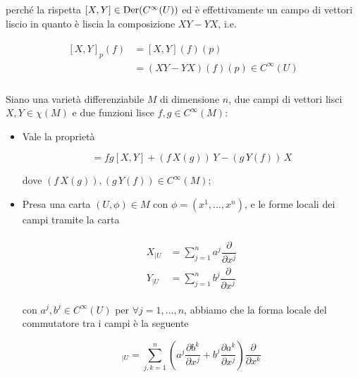 perché la rispetta $ [X,Y] \in \operatorname{Der}(C^{\infty}(U)) $ ed è effettivamente un campo di vettori liscio in quanto è liscia la composizione $ XY-YX $, i.e.

\begin{align}
	\begin{split}
		[X,Y]_{p}(f) &= [X,Y](f)(p)\\
		&= (XY-YX)(f)(p) \in C^{\infty}(U)\\
	\end{split}
\end{align}

\begin{definition}
	Siano una varietà differenziabile $ M $ di dimensione $ n $, due campi di vettori lisci $ X,Y \in \chi(M) $ e due funzioni lisce $ f,g \in C^{\infty}(M) $:
	
	\begin{itemize}
		\item Vale la proprietà
		
		\begin{equation}
			[f X, g Y] = f g [X,Y] + (f \, X(g)) \, Y - (g \, Y(f)) \, X
		\end{equation}
	
		dove $ (f \, X(g)), (g \, Y(f)) \in C^{\infty}(M) $;
	
		\item Presa una carta $ (U,\phi) \in M $ con $ \phi = (x^{1},\dots,x^{n}) $, e le forme locali dei campi tramite la carta
		
		\begin{align}
			\begin{split}
				X_{|U} &= \sum_{j=1}^{n} a^{j} \dfrac{\partial}{\partial x^{j}}\\
				Y_{|U} &= \sum_{j=1}^{n} b^{j} \dfrac{\partial}{\partial x^{j}}
			\end{split}
		\end{align}
	
		con $ a^{j},b^{j} \in C^{\infty}(U) $ per $ \forall j=1,\dots,n $, abbiamo che la forma locale del commutatore tra i campi è la seguente
		
		\begin{equation}
			[X,Y]_{|U} = \sum_{j,k=1}^{n} \left( a^{j} \dfrac{\partial b^{k}}{\partial x^{j}} + b^{j} \dfrac{\partial a^{k}}{\partial x^{j}} \right) \dfrac{\partial}{\partial x^{k}}
		\end{equation}
	\end{itemize}
\end{definition}

